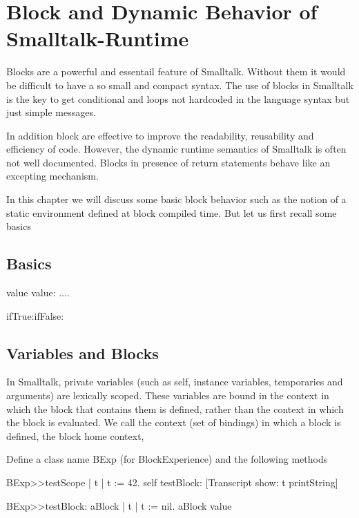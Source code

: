 \documentclass[a4paper,10pt,twoside]{book}
\begin{document}
\fi
\sloppy
\chapter{Block and Dynamic Behavior of Smalltalk-Runtime}

Blocks are a powerful and essentail feature of Smalltalk. Without them it
would be difficult to have a so small and compact syntax. The use of blocks in Smalltalk
is the key to get conditional and loops not hardcoded in the language syntax but just 
simple messages. 

In addition block are  effective to improve the readability, reusability and efficiency of code. 
However, the dynamic runtime semantics of Smalltalk is often not well documented. Blocks in presence of
return statements behave like an excepting mechanism. 

In this chapter we will discuss some basic block behavior such as the notion of a static environment 
defined at block compiled time. But let us first recall some basics

\section{Basics}

value
value:
....

ifTrue:ifFalse: 



\section{Variables and Blocks}
In Smalltalk, private variables (such as self, instance variables, temporaries and arguments) are 
lexically scoped. These variables are bound in the context in which the block that contains them is defined, rather than the context in which the block is evaluated.  We call the context (set of bindings) in which a block is defined, the block home context,

Define a class name BExp (for BlockExperience) and the following methods

\begin{code}{}
BExp>>testScope 
	| t | 
	t := 42. 
	self testBlock: [Transcript show: t printString] 
	
BExp>>testBlock: aBlock 
	| t | 
	t := nil. 
	aBlock value 
\end{code}
\end{document}
